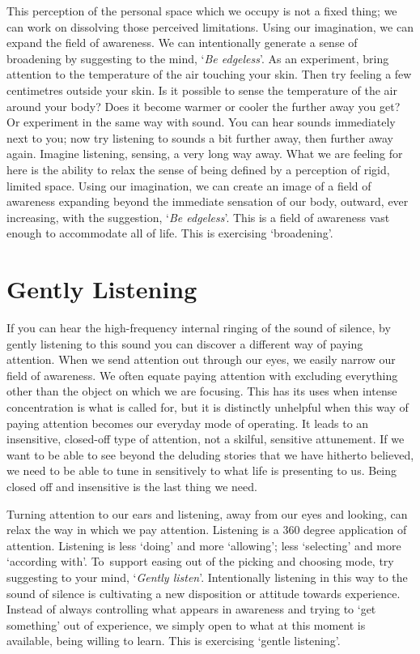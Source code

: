 This perception of the personal space which we occupy is not a fixed
thing; we can work on dissolving those perceived limitations. Using our
imagination, we can expand the field of awareness. We can intentionally
generate a sense of broadening by suggesting to the mind, ‘\emph{Be
edgeless}’. As an experiment, bring attention to the temperature of the
air touching your skin. Then try feeling a few centimetres outside your
skin. Is it possible to sense the temperature of the air around your
body? Does it become warmer or cooler the further away you get? Or
experiment in the same way with sound. You can hear sounds immediately
next to you; now try listening to sounds a bit further away, then
further away again. Imagine listening, sensing, a very long way away.
What we are feeling for here is the ability to relax the sense of being
defined by a perception of rigid, limited space. Using our imagination,
we can create an image of a field of awareness expanding beyond the
immediate sensation of our body, outward, ever increasing, with the
suggestion, ‘\emph{Be edgeless}’. This is a field of awareness vast enough to
accommodate all of life. This is exercising ‘broadening’.

\section{Gently Listening}

If you can hear the high-frequency internal ringing of the sound of
silence, by gently listening to this sound you can discover a different
way of paying attention. When we send attention out through our eyes, we
easily narrow our field of awareness. We often equate paying attention
with excluding everything other than the object on which we are
focusing. This has its uses when intense concentration is what is called
for, but it is distinctly unhelpful when this way of paying attention
becomes our everyday mode of operating. It leads to an insensitive,
closed-off type of attention, not a skilful, sensitive attunement. If we
want to be able to see beyond the deluding stories that we have hitherto
believed, we need to be able to tune in sensitively to what life is
presenting to us. Being closed off and insensitive is the last thing we
need.

Turning attention to our ears and listening, away from our eyes and
looking, can relax the way in which we pay attention. Listening is a 360
degree application of attention. Listening is less ‘doing’ and more
‘allowing’; less ‘selecting’ and more ‘according with’. To~support
easing out of the picking and choosing mode, try suggesting to your
mind, ‘\emph{Gently listen}’. Intentionally listening in this way to the
sound of silence is cultivating a new disposition or attitude towards
experience. Instead of always controlling what appears in awareness and
trying to ‘get something’ out of experience, we simply open to what at
this moment is available, being willing to learn. This is exercising
‘gentle listening’.

